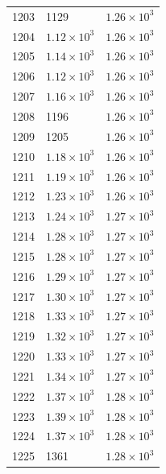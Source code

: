 \begin{table}[H]
\begin{tabular}{lll}
1203 & 1129 & $\displaystyle 1.26 \times 10^{3}$ \\
1204 & $\displaystyle 1.12 \times 10^{3}$ & $\displaystyle 1.26 \times 10^{3}$ \\
1205 & $\displaystyle 1.14 \times 10^{3}$ & $\displaystyle 1.26 \times 10^{3}$ \\
1206 & $\displaystyle 1.12 \times 10^{3}$ & $\displaystyle 1.26 \times 10^{3}$ \\
1207 & $\displaystyle 1.16 \times 10^{3}$ & $\displaystyle 1.26 \times 10^{3}$ \\
1208 & 1196 & $\displaystyle 1.26 \times 10^{3}$ \\
1209 & 1205 & $\displaystyle 1.26 \times 10^{3}$ \\
1210 & $\displaystyle 1.18 \times 10^{3}$ & $\displaystyle 1.26 \times 10^{3}$ \\
1211 & $\displaystyle 1.19 \times 10^{3}$ & $\displaystyle 1.26 \times 10^{3}$ \\
1212 & $\displaystyle 1.23 \times 10^{3}$ & $\displaystyle 1.26 \times 10^{3}$ \\
1213 & $\displaystyle 1.24 \times 10^{3}$ & $\displaystyle 1.27 \times 10^{3}$ \\
1214 & $\displaystyle 1.28 \times 10^{3}$ & $\displaystyle 1.27 \times 10^{3}$ \\
1215 & $\displaystyle 1.28 \times 10^{3}$ & $\displaystyle 1.27 \times 10^{3}$ \\
1216 & $\displaystyle 1.29 \times 10^{3}$ & $\displaystyle 1.27 \times 10^{3}$ \\
1217 & $\displaystyle 1.30 \times 10^{3}$ & $\displaystyle 1.27 \times 10^{3}$ \\
1218 & $\displaystyle 1.33 \times 10^{3}$ & $\displaystyle 1.27 \times 10^{3}$ \\
1219 & $\displaystyle 1.32 \times 10^{3}$ & $\displaystyle 1.27 \times 10^{3}$ \\
1220 & $\displaystyle 1.33 \times 10^{3}$ & $\displaystyle 1.27 \times 10^{3}$ \\
1221 & $\displaystyle 1.34 \times 10^{3}$ & $\displaystyle 1.27 \times 10^{3}$ \\
1222 & $\displaystyle 1.37 \times 10^{3}$ & $\displaystyle 1.28 \times 10^{3}$ \\
1223 & $\displaystyle 1.39 \times 10^{3}$ & $\displaystyle 1.28 \times 10^{3}$ \\
1224 & $\displaystyle 1.37 \times 10^{3}$ & $\displaystyle 1.28 \times 10^{3}$ \\
1225 & 1361 & $\displaystyle 1.28 \times 10^{3}$ \\

\end{tabular}
\end{table}

